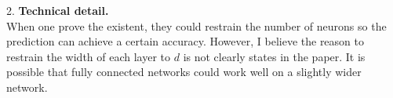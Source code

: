 \documentclass{article}
\begin{document}
2. \textbf{Technical detail.} \\
When one prove the existent, they could restrain the number of neurons so the prediction can achieve a certain accuracy. However, I believe the reason to restrain the width of each layer to $d$ is not clearly states in the paper. It is possible that fully connected networks could work well on a slightly wider network.

\newpage



\end{document}
